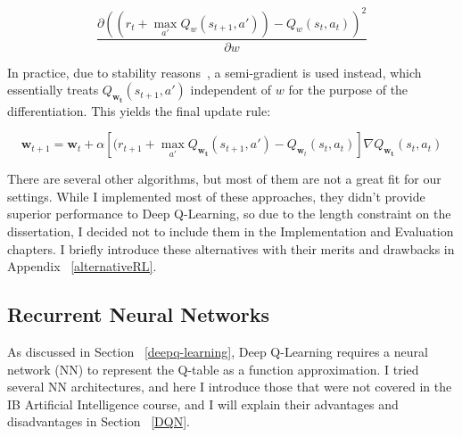 $$\frac{\partial (( r_t + \max_{a'} Q_w(s_{t+1}, a')) - Q_w(s_t,a_t))^2}{\partial w}$$

In practice, due to stability reasons~\cite{barnard1993semigradient},  a semi-gradient is used instead, which essentially treats $Q_{\mathbf{w_t}}(s_{t+1}, a')$ independent of $w$ for the purpose of the differentiation. This yields the final update rule:


\begin{equation} \label{eq:deep-q-learning-update-with-semi-gradient}
\mathbf{w}_{t+1} = \mathbf{w}_t + \alpha[( r_{t+1}+ \max_{a'} Q_{\mathbf{w_t}}(s_{t+1}, a') - Q_{\mathbf{w}_t}(s_t,a_t)]\nabla Q_{\mathbf{w_t}}(s_{t}, a_t)
\end{equation}

There are several other algorithms, but most of them are not a great fit for our settings. While I implemented most of these approaches, they didn't provide superior performance to Deep Q-Learning, so due to the length constraint on the dissertation, I decided not to include them in the Implementation and Evaluation chapters. I briefly introduce these alternatives with their merits and drawbacks in Appendix ~\ref{alternativeRL}. 


\subsection{Recurrent Neural Networks} \label{RNN}


As discussed in Section ~\ref{deepq-learning}, Deep Q-Learning requires a neural network (NN) to represent the Q-table as a function approximation. I tried several NN architectures, and here I introduce those that were not covered in the IB Artificial Intelligence course, and I will explain their advantages and disadvantages in Section ~\ref{DQN}. 

